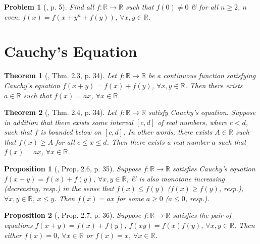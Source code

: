 \documentclass{article}
\numberwithin{equation}{section}
\newtheorem{problem}{Problem}[section]
\newtheorem{proposition}{Proposition}[section]
\newtheorem{theorem}{Theorem}[section]
\begin{document}
\begin{problem}[\cite{Dung_cac_phuong_phap_giai_toan_qua_cac_ky_thi_olympic_2022}, p. 5]
	Find all $f:\mathbb{R}\to\mathbb{R}$ such that $f(0)\ne0$ \& for all $n\ge2$, $n$ even, $f(x) = f(x + y^n + f(y))$, $\forall x,y\in\mathbb{R}$.
\end{problem}


\section{Cauchy's Equation}

\begin{theorem}[\cite{Small2007}, Thm. 2.3, p. 34]
	Let $f:\mathbb{R}\to\mathbb{R}$ be a continuous function satisfying Cauchy's equation $f(x + y) = f(x) + f(y)$, $\forall x,y\in\mathbb{R}$. Then there exists $a\in\mathbb{R}$ such that $f(x) = ax$, $\forall x\in\mathbb{R}$.
\end{theorem}

\begin{theorem}[\cite{Small2007}, Thm. 2.4, p. 34]
	Let $f:\mathbb{R}\to\mathbb{R}$ satisfy Cauchy's equation. Suppose in addition that there exists some interval $[c,d]$ of real numbers, where $c < d$, such that $f$ is bounded below on $[c,d]$. In other words, there exists $A\in\mathbb{R}$ such that $f(x)\ge A$ for all $c\le x\le d$. Then there exists a real number $a$ such that $f(x) = ax$, $\forall x\in\mathbb{R}$.
\end{theorem}

\begin{proposition}[\cite{Small2007}, Prop. 2.6, p. 35]
	Suppose $f:\mathbb{R}\to\mathbb{R}$ satisfies Cauchy's equation $f(x + y) = f(x) + f(y)$, $\forall x,y\in\mathbb{R}$, \& is also monotone increasing (decreasing, resp.) in the sense that $f(x)\le f(y)$ ($f(x)\ge f(y)$, resp.), $\forall x,y\in\mathbb{R}$, $x\le y$. Then $f(x) = ax$ for some $a\ge0$ ($a\le0$, resp.).
\end{proposition}

\begin{proposition}[\cite{Small2007}, Prop. 2.7, p. 36]
	Suppose $f:\mathbb{R}\to\mathbb{R}$ satisfies the pair of equations $f(x + y) = f(x) + f(y)$, $f(xy) = f(x)f(y)$, $\forall x,y\in\mathbb{R}$. Then either $f(x) = 0$, $\forall x\in\mathbb{R}$ or $f(x) = x$, $\forall x\in\mathbb{R}$.
\end{proposition}


\printbibliography[heading=bibintoc]
	
\end{document}
